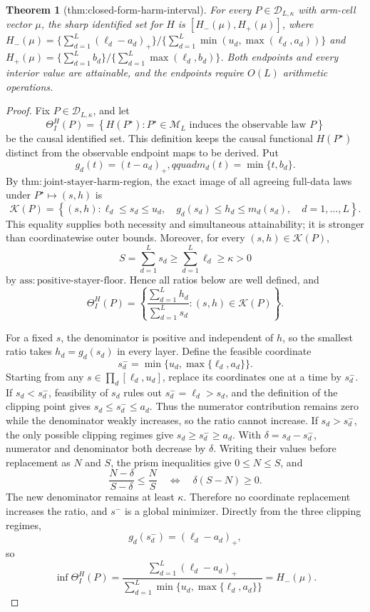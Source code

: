 \documentclass{article}
\newtheorem{theorem}{Theorem}
\begin{document}
\begin{theorem}[thm:closed-form-harm-interval]\label{thm:closed-form-harm-interval}
For every \(P\in\mathcal D_{L,\kappa}\) with arm-cell vector \(\mu\), the sharp identified set for \(H\) is \([H_-(\mu),H_+(\mu)]\), where \(H_-(\mu)=\{\sum_{d=1}^{L}(\ell_d-a_d)_+\}/\{\sum_{d=1}^{L}\min(u_d,\max(\ell_d,a_d))\}\) and \(H_+(\mu)=\{\sum_{d=1}^{L}b_d\}/\{\sum_{d=1}^{L}\max(\ell_d,b_d)\}\). Both endpoints and every interior value are attainable, and the endpoints require \(O(L)\) arithmetic operations.
\end{theorem}
\begin{proof}
Fix \(P\in\mathcal D_{L,\kappa}\), and let
\[\Theta_I^H(P)=\left\{H(P^{\star}):P^{\star}\in\mathcal M_L\text{ induces the observable law }P\right\}\]
be the causal identified set.  This definition keeps the causal functional \(H(P^{\star})\) distinct from the observable endpoint maps to be derived.  Put
\[g_d(t)=(t-a_d)_+,qquad m_d(t)=\min\{t,b_d\}.\]
By \(\mathrm{thm{:}joint\mbox{-}stayer\mbox{-}harm\mbox{-}region}\), the exact image of all agreeing full-data laws under \(P^{\star}\mapsto(s,h)\) is
\[\mathcal K(P)=\left\{(s,h):\ell_d\le s_d\le u_d,\quad
g_d(s_d)\le h_d\le m_d(s_d),\quad d=1,\ldots,L\right\}.\]
This equality supplies both necessity and simultaneous attainability; it is stronger than coordinatewise outer bounds.  Moreover, for every \((s,h)\in\mathcal K(P)\),
\[S=\sum_{d=1}^{L}s_d\ge\sum_{d=1}^{L}\ell_d\ge\kappa>0\]
by \(\mathrm{ass{:}positive\mbox{-}stayer\mbox{-}floor}\).  Hence all ratios below are well defined, and
\[\Theta_I^H(P)=\left\{\frac{\sum_{d=1}^{L}h_d}{\sum_{d=1}^{L}s_d}:(s,h)\in\mathcal K(P)\right\}.\]

For a fixed \(s\), the denominator is positive and independent of \(h\), so the smallest ratio takes \(h_d=g_d(s_d)\) in every layer.  Define the feasible coordinate
\[s_d^- =\min\{u_d,\max\{\ell_d,a_d\}\}.\]
Starting from any \(s\in\prod_d[\ell_d,u_d]\), replace its coordinates one at a time by \(s_d^-\).  If \(s_d<s_d^-\), feasibility of \(s_d\) rules out \(s_d^-=\ell_d>s_d\), and the definition of the clipping point gives \(s_d\le s_d^-\le a_d\).  Thus the numerator contribution remains zero while the denominator weakly increases, so the ratio cannot increase.  If \(s_d>s_d^-\), the only possible clipping regimes give \(s_d\ge s_d^-\ge a_d\).  With \(\delta=s_d-s_d^-\), numerator and denominator both decrease by \(\delta\).  Writing their values before replacement as \(N\) and \(S\), the prism inequalities give \(0\le N\le S\), and
\[\frac{N-\delta}{S-\delta}\le\frac NS
\quad\Longleftrightarrow\quad
\delta(S-N)\ge0.\]
The new denominator remains at least \(\kappa\).  Therefore no coordinate replacement increases the ratio, and \(s^-\) is a global minimizer.  Directly from the three clipping regimes,
\[g_d(s_d^-)=(\ell_d-a_d)_+,\]
so
\[\inf\Theta_I^H(P)=
\frac{\sum_{d=1}^{L}(\ell_d-a_d)_+}
{\sum_{d=1}^{L}\min\{u_d,\max\{\ell_d,a_d\}\}}=H_-(\mu).\]


\end{proof}
\end{document}
